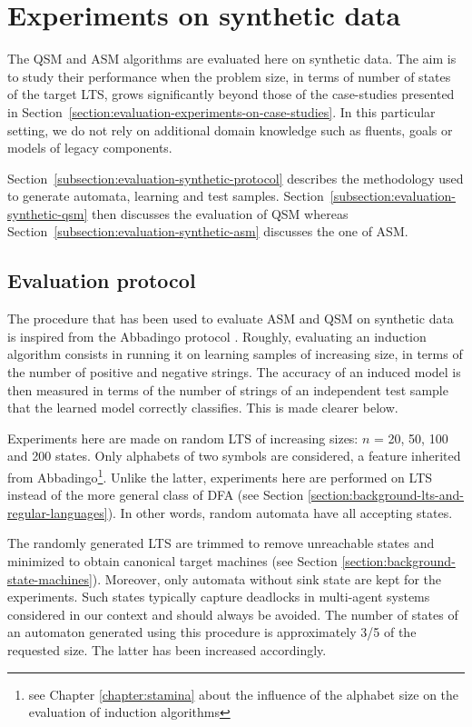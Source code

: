 \section{Experiments on synthetic data\label{section:evaluation-experiments-on-synthetic-data}}

The QSM and ASM algorithms are evaluated here on synthetic data. The aim is to study their performance when the problem size, in terms of number of states of the target LTS, grows significantly beyond those of the case-studies presented in Section~\ref{section:evaluation-experiments-on-case-studies}. In this particular setting, we do not rely on additional domain knowledge such as fluents, goals or models of legacy components.

Section~\ref{subsection:evaluation-synthetic-protocol} describes the methodology used to generate automata, learning and test samples. Section~\ref{subsection:evaluation-synthetic-qsm} then discusses the evaluation of QSM whereas Section~\ref{subsection:evaluation-synthetic-asm} discusses the one of ASM.  

\subsection{Evaluation protocol\label{subsection:evaluation-synthetic-protocol}}

The procedure that has been used to evaluate ASM and QSM on synthetic data is inspired from the Abbadingo protocol \cite{Lang:1998}. Roughly, evaluating an induction algorithm consists in running it on learning samples of increasing size, in terms of the number of positive and negative strings. The accuracy of an induced model is then measured in terms of the number of strings of an independent test sample that the learned model correctly classifies. This is made clearer below.

Experiments here are made on random LTS of increasing sizes: $n$ = 20, 50, 100 and 200 states. Only alphabets of two symbols are considered, a feature inherited from Abbadingo\footnote{see Chapter \ref{chapter:stamina} about the influence of the alphabet size on the evaluation of induction algorithms}. Unlike the latter, experiments here are performed on LTS instead of the more general class of DFA (see Section \ref{section:background-lts-and-regular-languages}). In other words, random automata have all accepting states.

The randomly generated LTS are trimmed to remove unreachable states and minimized to obtain canonical target machines (see Section \ref{section:background-state-machines}). Moreover, only automata without sink state are kept for the experiments. Such states typically capture deadlocks in multi-agent systems considered in our context and should always be avoided. The number of states of an automaton generated using this procedure is approximately 3/5 of the requested size. The latter has been increased accordingly.

